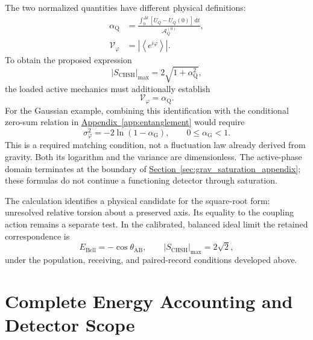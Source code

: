 The two normalized quantities have different physical definitions:
\begin{equation}
    \begin{aligned}
    \alpha_{\mathrm Q}
    &=\frac{\int_0^{\Delta t}[U_Q-U_Q(0)]\,\mathrm dt}
            {\mathcal A_Q^{(0)}},\\
    \mathcal V_\varphi
    &=\left|\left\langle e^{i\varphi}\right\rangle\right|.
    \end{aligned}
\end{equation}
To obtain the proposed expression
\begin{equation}
    |S_{\mathrm{CHSH}}|_{\max}=2\sqrt{1+\alpha_{\mathrm Q}^{2}},
\end{equation}
the loaded active mechanics must additionally establish
\begin{equation}
    \boxed{\mathcal V_\varphi=\alpha_{\mathrm Q}}.
\end{equation}
For the Gaussian example, combining this identification with the conditional zero-sum relation in \hyperref[app:entanglement]{Appendix~\ref*{app:entanglement}} would require
\begin{equation}
    \boxed{
    \sigma_\varphi^2=-2\ln(1-\alpha_{\mathrm G}),
    \qquad 0\leq\alpha_{\mathrm G}<1
    }.
\end{equation}
This is a required matching condition, not a fluctuation law already derived from gravity. Both its logarithm and the variance are dimensionless. The active-phase domain terminates at the boundary of \hyperref[sec:grav_saturation_appendix]{Section~\ref*{sec:grav_saturation_appendix}}; these formulas do not continue a functioning detector through saturation.

The calculation identifies a physical candidate for the square-root form: unresolved relative torsion about a preserved axis. Its equality to the coupling action remains a separate test. In the calibrated, balanced ideal limit the retained correspondence is
\begin{equation}
    \boxed{
    E_{\mathrm{Bell}}=-\cos\theta_{\mathrm{AB}},
    \qquad |S_{\mathrm{CHSH}}|_{\max}=2\sqrt2
    },
    \label{eq:entanglement_ideal_summary}
\end{equation}
under the population, receiving, and paired-record conditions developed above.

\section{Complete Energy Accounting and Detector Scope}
\label{sec:entanglement_constraint_work}


